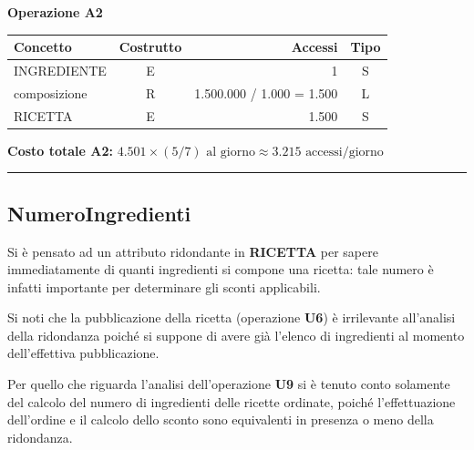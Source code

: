 \vspace{1.5em}

\noindent\textbf{Operazione A2}
\begin{table}[H]
\centering
\renewcommand{\arraystretch}{1.2}
\setlength{\tabcolsep}{8pt}
\begin{tabularx}{\textwidth}{|X|c|r|c|}
\hline
\textbf{Concetto} & \textbf{Costrutto} & \textbf{Accessi} & \textbf{Tipo} \\
\hline
INGREDIENTE & E & 1 & S \\
\hline
composizione & R & 1.500.000 / 1.000 = 1.500 & L \\
\hline
RICETTA & E & 1.500 & S \\
\hline
\end{tabularx}
\end{table}
\textbf{Costo totale A2:} $4.501 \times (5 / 7) \mbox{ al giorno} \approx 3.215 \mbox{ accessi/giorno}$

\vspace{1.5em}

\noindent{}

\vspace{2em}
\hrule
\vspace{2em}

\subsection{NumeroIngredienti}
Si è pensato ad un attributo ridondante in \textbf{RICETTA} per sapere immediatamente di quanti ingredienti si compone una ricetta: tale numero è infatti importante per determinare gli sconti applicabili.

Si noti che la pubblicazione della ricetta (operazione \textbf{U6}) è irrilevante all’analisi della ridondanza poiché si suppone di avere già l’elenco di ingredienti al momento dell’effettiva pubblicazione.

Per quello che riguarda l’analisi dell’operazione \textbf{U9} si è tenuto conto solamente del calcolo del numero di ingredienti delle ricette ordinate, poiché l’effettuazione dell’ordine e il calcolo dello sconto sono equivalenti in presenza o meno della ridondanza.

